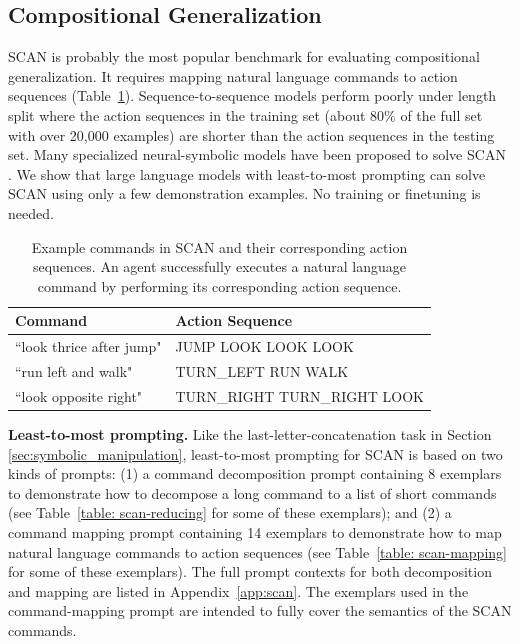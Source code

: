 \documentclass{article}
\begin{document}
\subsection{Compositional Generalization}
\label{sec:compositional_generalization}
SCAN \citep{lake2018generalization} is probably the most popular benchmark for evaluating compositional generalization. It requires mapping natural language commands to action sequences (Table~\ref{table: scan}). %
Sequence-to-sequence models perform poorly under length split where the action sequences in the training set (about $80\%$ of the full set with over 20,000 examples) are shorter than the action sequences in the testing set. %
Many specialized neural-symbolic models have been proposed to solve SCAN \citep{chen2020compositional,liu2020compositional, nye2020learning, shaw2021compositional, kim2021sequence}. We show that large language models with least-to-most prompting can solve SCAN using only a few demonstration examples. No training or finetuning is needed.

\begin{table}[h!]
\centering
\begin{tabularx}{0.78\textwidth}{l|X}
\hline
  \textbf{Command} & \textbf{Action Sequence} \\
 \hline
 ``look thrice after jump" & JUMP LOOK LOOK LOOK\\
 ``run left and walk" & TURN\_LEFT RUN WALK\\
 ``look opposite right" & TURN\_RIGHT TURN\_RIGHT LOOK\\
 \hline
 \end{tabularx} 
 \vspace{5pt}
\caption {Example commands in SCAN and their corresponding action sequences. An agent successfully executes a natural language command by performing its corresponding action sequence.}
\label{table: scan}
\end{table}


\textbf{Least-to-most prompting.} Like the last-letter-concatenation task in Section \ref{sec:symbolic_manipulation}, least-to-most prompting for SCAN is based on two kinds of prompts: (1) a command decomposition prompt containing 8 exemplars to demonstrate how to decompose a long command to a list of short commands (see Table~\ref{table: scan-reducing} for some of these exemplars);  and (2) a command mapping prompt containing 14 exemplars to demonstrate how to map natural language commands to action sequences (see Table~\ref{table: scan-mapping} for some of these exemplars). The full prompt contexts for both decomposition and mapping are listed in Appendix~\ref{app:scan}. The exemplars used in the command-mapping prompt are intended to fully cover the semantics of the SCAN commands.  
\end{document}
